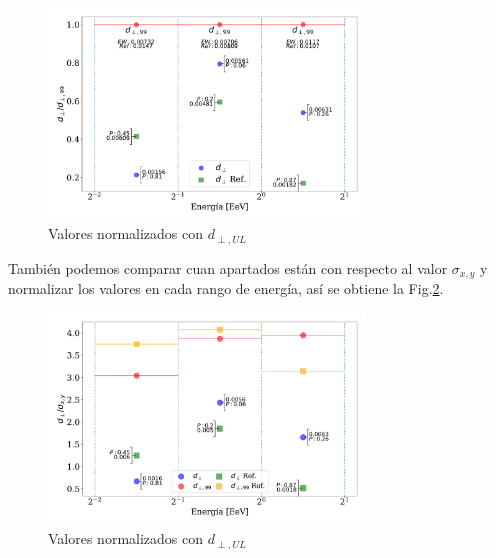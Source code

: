 \documentclass[11pt,papel,oneside,singlespace]{ibtesis}
\begin{document}
    \begin{figure}[H]
        \begin{small}
            \begin{center}
                \includegraphics[width=0.75\textwidth]{d_perp_normalizado.pdf}
            \end{center}
            \caption{Valores normalizados con $d_{\perp,UL}$}
            \label{fig:normalizado}
        \end{small}
    \end{figure}

    También podemos comparar cuan apartados están con respecto al valor $\sigma_{x,y}$ y normalizar los valores en cada rango de energía, así se obtiene la Fig.\ref{fig:normalizado_sigma}.

    \begin{figure}[H]
        \begin{small}
            \begin{center}
                \includegraphics[width=0.75\textwidth]{d_perp_normalizado_sigmas_v4.pdf}
            \end{center}
            \caption{Valores normalizados con $d_{\perp,UL}$}
            \label{fig:normalizado_sigma}
        \end{small}
    \end{figure}
\end{document}
